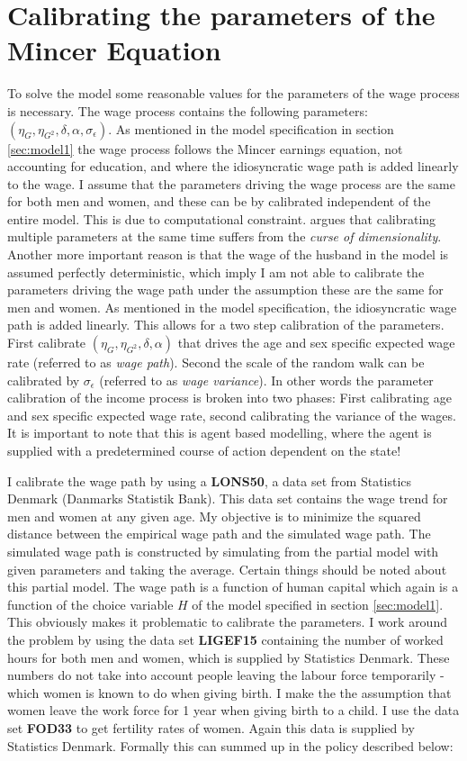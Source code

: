 \section{Calibrating the parameters of the Mincer Equation}


To solve the model some reasonable values for the parameters of the wage process is necessary. The wage process contains the following parameters: $(\eta_G, \eta_{G^2}, \delta, \alpha, \sigma_{\epsilon})$. As mentioned in the model specification in section \ref{sec:model1} the wage process follows the Mincer earnings equation, not accounting for education, and where the idiosyncratic wage path is added linearly to the wage. I assume that the parameters driving the wage process are the same for both men and women, and these can be by calibrated independent of the entire model. This is due to computational constraint. \textcite{friedman_elements_2001} argues that calibrating multiple parameters at the same time suffers from the \textit{curse of dimensionality}. Another more important reason is that the wage of the husband in the model is assumed perfectly deterministic, which imply I am not able to calibrate the parameters driving the wage path under the assumption these are the same for men and women. As mentioned in the model specification, the idiosyncratic wage path is added linearly. This  allows for a two step calibration of the parameters. First calibrate $(\eta_G, \eta_{G^2}, \delta, \alpha)$ that drives the age and sex specific expected wage rate (referred to as \textit{wage path}). Second the scale of the random walk can be calibrated by $\sigma_\epsilon$ (referred to as \textit{wage variance}). In other words the parameter calibration of the income process is broken into two phases: First calibrating age and sex specific expected wage rate, second calibrating the variance of the wages. It is important to note that this is agent based modelling, where the agent is supplied with a predetermined course of action dependent on the state! 

I calibrate the wage path by using a \textbf{LONS50}, a data set from Statistics Denmark (Danmarks Statistik Bank). This data set contains the wage trend for men and women at any given age. My objective is to minimize the squared distance between the empirical wage path and the simulated wage path. The simulated wage path is constructed by simulating from the partial model with given parameters and taking the average. Certain things should be noted about this partial model. The wage path is a function of human capital which again is a function of the choice variable $H$ of the model specified in section \ref{sec:model1}. This obviously makes it problematic to calibrate the parameters. I work around the problem by using the data set \textbf{LIGEF15} containing the number of worked hours for both men and women, which is supplied by Statistics Denmark. These numbers do not take into account people leaving the labour force temporarily - which women is known to do when giving birth. I make the the assumption that women leave the work force for 1 year when giving birth to a child. I use the data set \textbf{FOD33} to get fertility rates of women. Again this data is supplied by Statistics Denmark. Formally this can summed up in the policy described below:

